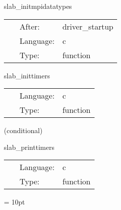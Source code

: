 
\hspace{5mm} slab\_initmpidatatypes 

\hspace{5mm}{\it create mpi datatypes for complex variables in c } 


\hspace{5mm}

 \begin{tabular*}{160mm}{cll} 
~ & After:  & driver\_startup \\ 
~ & Language:  & c \\ 
~ & Type:  & function \\ 
\end{tabular*} 


\vspace{5mm}


\hspace{5mm} slab\_inittimers 

\hspace{5mm}{\it initialise timers } 


\hspace{5mm}

 \begin{tabular*}{160mm}{cll} 
~ & Language:  & c \\ 
~ & Type:  & function \\ 
\end{tabular*} 


\vspace{5mm}

   (conditional) 

\hspace{5mm} slab\_printtimers 

\hspace{5mm}{\it print timers } 


\hspace{5mm}

 \begin{tabular*}{160mm}{cll} 
~ & Language:  & c \\ 
~ & Type:  & function \\ 
\end{tabular*} 



\vspace{5mm}\parskip = 10pt 

